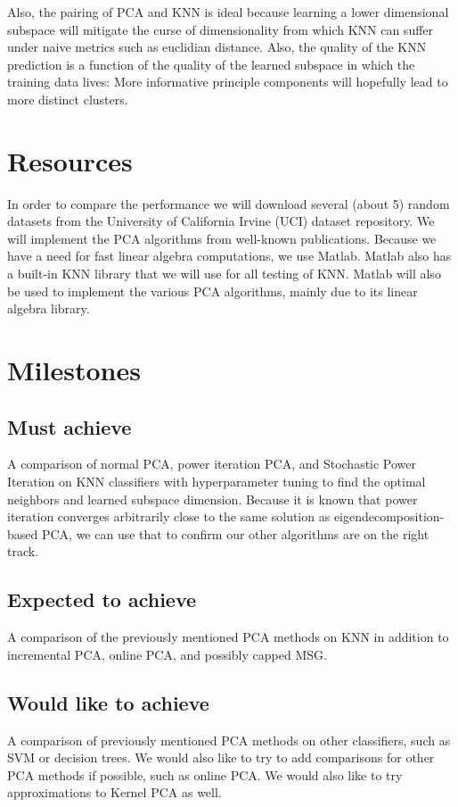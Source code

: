 \documentclass[11pt]{article}
\begin{document}
Also, the pairing of PCA and KNN is ideal because learning a lower dimensional subspace will mitigate the curse of dimensionality from which KNN can suffer under naive metrics such as euclidian distance. Also, the quality of the KNN prediction is a function of the quality of the learned subspace in which the training data lives: More informative principle components will hopefully lead to more distinct clusters. 


\section{Resources}
In order to compare the performance we will download several (about 5) random datasets from the University of California Irvine (UCI) dataset repository. We will implement the PCA algorithms from well-known publications. Because we have a need for fast linear algebra computations, we use Matlab. Matlab also has a built-in KNN library that we will use for all testing of KNN. Matlab will also be used to implement the various PCA algorithms, mainly due to its linear algebra library. 


\section{Milestones}
\subsection{Must achieve}
A comparison of normal PCA, power iteration PCA, and Stochastic Power Iteration on KNN classifiers with hyperparameter tuning to find the optimal neighbors and learned subspace dimension. Because it is known that power iteration converges arbitrarily close to the same solution as eigendecomposition-based PCA, we can use that to confirm our other algorithms  are on the right track. 
\subsection{Expected to achieve}
A comparison of the previously mentioned PCA methods on KNN in addition to incremental PCA, online PCA,  and possibly capped MSG.
\subsection{Would like to achieve}
A comparison of previously mentioned PCA methods on other classifiers, such as SVM or decision trees. We would also like to try to add comparisons for other PCA methods if possible, such as online PCA. We would also like to try approximations to Kernel PCA as well. 
\end{document}

